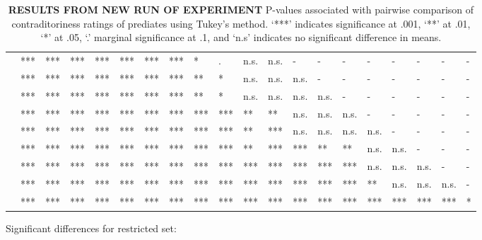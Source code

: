\documentclass[11pt,fleqn]{article}
\newcommand{\6}{\mbox{$[\hspace*{-.6mm}[$}}
\newcommand{\9}{\mbox{$]\hspace*{-.6mm}]$}}
\begin{document}
\begin{landscape}
\begin{table}[h!]
\begin{tabular}{l l l l l l l l l l l l l l l l l l l l }
\color{green}{\em admit}\color{black}			& *** & *** & *** & *** & *** & *** & *** & * & . & n.s. & n.s. & - & - & - & - & - & - & - & - \\
\color{blue}{\em establish}\color{black}		& *** & *** & *** & *** & *** & *** & *** & ** & * & n.s. & n.s. &  n.s. & - & - & - & - & - & - & - \\
\color{green}{\em demonstrate}\color{black}	& *** & *** & *** & *** & *** & *** & *** & ** & * & n.s. & n.s. & n.s. & n.s. & - & - & - & - & - & - \\
\color{green}{\em confirm}\color{black}		& *** & *** & *** & *** & *** & *** & *** & *** & *** & ** & ** & n.s. & n.s. & n.s. & - & - & - & - & - \\
\color{blue}{\em discover}\color{black}		& *** & *** & *** & *** & *** & *** & *** & *** & *** & ** & *** & n.s. & n.s. & n.s. & n.s. & - & - & - & - \\
\color{blue}{\em see}\color{black}			& *** & *** & *** & *** & *** & *** & *** & *** & *** & ** & *** & *** & ** & ** & n.s. & n.s. & - & - & - \\
\color{blue}{\em know}\color{black}			& *** & *** & *** & *** & *** & *** & *** & *** & *** & *** & *** & *** & *** & *** & n.s. & n.s. & n.s. & - & - \\
\color{green}{\em prove}\color{black}			& *** & *** & *** & *** & *** & *** & *** & *** & *** & *** & *** & *** & *** & *** & ** & n.s. & n.s. & n.s. & -  \\
\color{blue}{\em be right}\color{black}		& *** & *** & *** & *** & *** & *** & *** & *** & ***  & ***  & *** & *** & *** & *** & *** & *** & *** & *** & *  \\

\bottomrule
\end{tabular}
\caption{{\bf RESULTS FROM NEW RUN OF EXPERIMENT} P-values associated with pairwise comparison of contraditoriness ratings of prediates using Tukey's method. `***' indicates significance at .001, `**' at .01, `*' at .05, `.' marginal significance at .1, and `n.s' indicates no significant difference in means.}\label{t-pairwise}
\end{table}
\end{landscape}


\newpage

Significant differences for restricted set:
\end{document}
